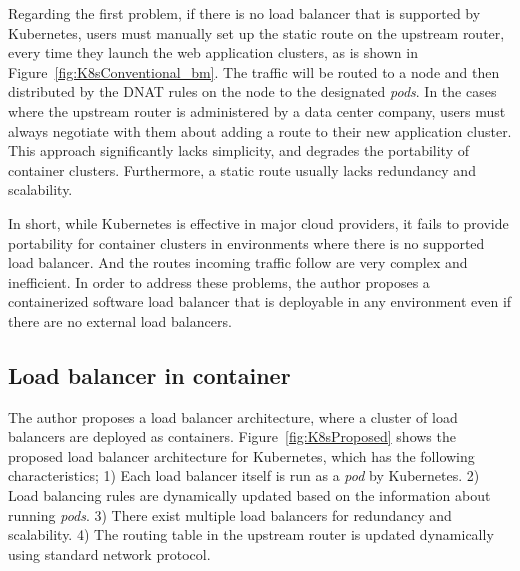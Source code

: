 Regarding the first problem, if there is no load balancer that is supported by Kubernetes, users must manually set up the static route on the upstream router, every time they launch the web application clusters, as is shown in Figure~\ref{fig:K8sConventional_bm}.
The traffic will be routed to a node and then distributed by the DNAT rules on the node to the designated {\em pods}.
In the cases where the upstream router is administered by a data center company, users must always negotiate with them about adding a route to their new application cluster.
This approach significantly lacks simplicity, and degrades the portability of container clusters.
Furthermore, a static route usually lacks redundancy and scalability.

In short, while Kubernetes is effective in major cloud providers, it fails to provide portability for container clusters in environments where there is no supported load balancer. 
And the routes incoming traffic follow are very complex and inefficient.
In order to address these problems, the author proposes a containerized software load balancer 
that is deployable in any environment even if there are no external load balancers.

\FloatBarrier

\subsection{Load balancer in container}\label{Load balancer in container}

The author proposes a load balancer architecture, where a cluster of load balancers are deployed as containers.
Figure~\ref{fig:K8sProposed} shows the proposed load balancer architecture for Kubernetes,
which has the following characteristics;
1) Each load balancer itself is run as a {\em pod} by Kubernetes. 
2) Load balancing rules are dynamically updated based on the information about running {\em pods}.
3) There exist multiple load balancers for redundancy and scalability.
4) The routing table in the upstream router is updated dynamically using standard network protocol.


